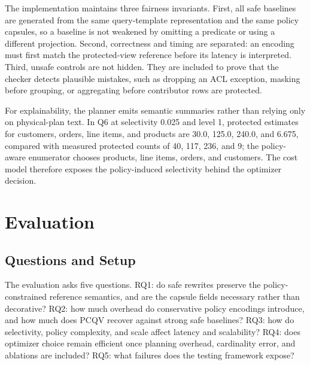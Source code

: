 \documentclass[conference]{IEEEtran}
\newcommand{\pcqv}{PCQV}
\begin{document}
The implementation maintains three fairness invariants. First, all safe baselines are generated from the same query-template representation and the same policy capsules, so a baseline is not weakened by omitting a predicate or using a different projection. Second, correctness and timing are separated: an encoding must first match the protected-view reference before its latency is interpreted. Third, unsafe controls are not hidden. They are included to prove that the checker detects plausible mistakes, such as dropping an ACL exception, masking before grouping, or aggregating before contributor rows are protected.

For explainability, the planner emits semantic summaries rather than relying only on physical-plan text. In Q6 at selectivity 0.025 and level 1, protected estimates for customers, orders, line items, and products are 30.0, 125.0, 240.0, and 6.675, compared with measured protected counts of 40, 117, 236, and 9; the policy-aware enumerator chooses products, line items, orders, and customers. The cost model therefore exposes the policy-induced selectivity behind the optimizer decision.


\section{Evaluation}
\label{sec:evaluation}

\subsection{Questions and Setup}
The evaluation asks five questions. RQ1: do safe rewrites preserve the policy-constrained reference semantics, and are the capsule fields necessary rather than decorative? RQ2: how much overhead do conservative policy encodings introduce, and how much does \pcqv{} recover against strong safe baselines? RQ3: how do selectivity, policy complexity, and scale affect latency and scalability? RQ4: does optimizer choice remain efficient once planning overhead, cardinality error, and ablations are included? RQ5: what failures does the testing framework expose?
\end{document}
